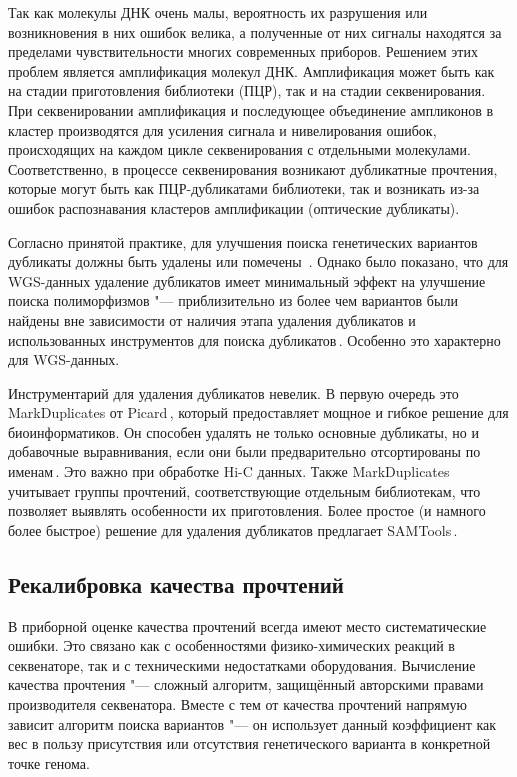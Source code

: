 \documentclass[12pt, twoside, a4paper]{article}
\newcommand{\mln}{млн}
\newcommand{\utilname}[1]{\textenglish{#1}}
\begin{document}
Так как молекулы ДНК очень малы, вероятность их разрушения или возникновения в них ошибок велика, а полученные от них сигналы находятся за пределами чувствительности многих современных приборов.
Решением этих проблем является амплификация молекул ДНК.
Амплификация может быть как на стадии приготовления библиотеки (ПЦР), так и на стадии секвенирования.
При секвенировании амплификация и последующее объединение ампликонов в кластер производятся для усиления сигнала и нивелирования ошибок, происходящих на каждом цикле секвенирования с отдельными молекулами.
Соответственно, в процессе секвенирования возникают дубликатные прочтения, которые могут быть как ПЦР\hyp{}дубликатами библиотеки, так и возникать из-за ошибок распознавания кластеров амплификации (оптические дубликаты).

Согласно принятой практике, для улучшения поиска генетических вариантов дубликаты должны быть удалены или помечены \,\cite{Auwera_2013}. Однако было показано, что для WGS-данных удаление дубликатов имеет минимальный эффект на улучшение поиска полиморфизмов "--- приблизительно  из более чем \numprint[\mln]{17} вариантов были найдены вне зависимости от наличия этапа удаления дубликатов и использованных инструментов для поиска дубликатов\,\cite{Ebbert_2016}.
Особенно это характерно для WGS-данных.

Инструментарий для удаления дубликатов невелик.
В первую очередь это \utilname{MarkDuplicates} от Picard\,\citep{PicardTools}, который предоставляет мощное и гибкое решение для биоинформатиков.
Он способен удалять не только основные дубликаты, но и добавочные выравнивания, если они были предварительно отсортированы по именам\,\citep{Auwera_2013}.
Это важно при обработке Hi-C данных.
Также \utilname{MarkDuplicates} учитывает группы прочтений, соответствующие отдельным библиотекам, что позволяет выявлять особенности их приготовления.
Более простое (и намного более быстрое) решение для удаления дубликатов предлагает \utilname{SAMTools}\,\citep{Li_2009_SAMTools}.

\subsection*{Рекалибровка качества прочтений}

В приборной оценке качества прочтений всегда имеют место систематические ошибки.
Это связано как с особенностями физико-химических реакций в секвенаторе, так и с техническими недостатками оборудования.
Вычисление качества прочтения "--- сложный алгоритм, защищённый авторскими правами производителя секвенатора.
Вместе с тем от качества прочтений напрямую зависит алгоритм поиска вариантов "--- он использует данный коэффициент как вес в пользу присутствия или отсутствия генетического варианта в конкретной точке генома.
\end{document}
